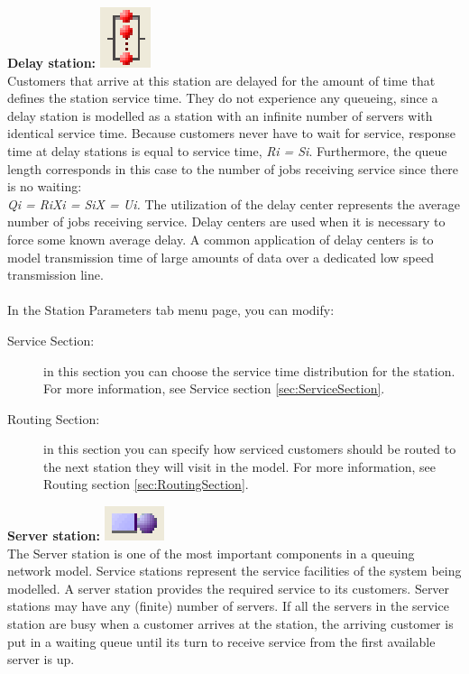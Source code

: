 \begin{enumerate*}
\item \textbf{Delay station:} \includegraphics[scale=1]{img/jsim/delay.eps}\\
Customers that arrive at this station are delayed for the amount of time that defines the station service time. They do not experience any queueing, since a delay station is modelled as a station with an infinite number of servers with identical service time. Because customers never have to wait for service, response time at delay
stations is equal to service time, \emph{Ri = Si}. Furthermore, the queue length corresponds in this case to the number of jobs receiving service since there is no waiting:\\
\emph{Qi = RiXi = SiX = Ui. }
The utilization of the delay center represents the average number of jobs receiving service.
Delay centers are used when it is necessary to force some known average delay. A common application of delay centers is to model
transmission time of large amounts of data over a dedicated low speed transmission line.\\\\
In the Station Parameters tab menu page, you can modify:
\begin{description}
\item[Service Section:]
in this section you can choose the service time distribution for the station.
For more information, see Service section \ref{sec:ServiceSection}.
\item[Routing Section:]
in this section you can specify how serviced customers should be routed to the next station they will visit in the model.
For more information, see Routing section \ref{sec:RoutingSection}.
\end{description}
\item \textbf{Server station:} \includegraphics[scale=1]{img/jsim/server.eps}\\
The Server station is one of the most important components in a queuing network model. Service stations represent the service facilities of the system being modelled. A server station provides the required service to its customers. Server stations may have any (finite) number of servers. If all the servers in the service station are busy when a customer arrives at the station, the arriving customer is put in a waiting queue until its turn to receive service from the first available server is up.

\end{enumerate*}

